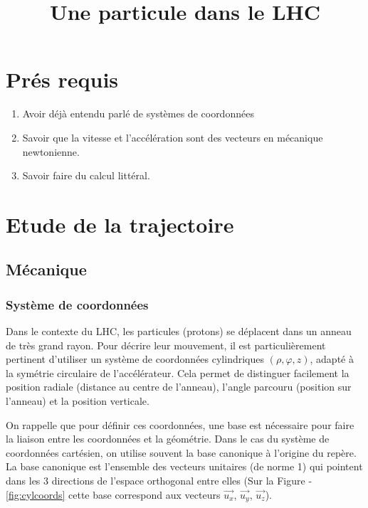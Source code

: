 \documentclass[14pt]{article}
\title{Une particule dans le LHC}
\author{}
\begin{document}
\maketitle
\tableofcontents

\section*{Prés requis}

\begin{enumerate}
    \item Avoir déjà entendu parlé de systèmes de coordonnées
    \item Savoir que la vitesse et l'accélération sont des vecteurs en mécanique newtonienne.
    \item Savoir faire du calcul littéral.
\end{enumerate}

\section{Etude de la trajectoire}


\subsection{Mécanique}\label{meca}

\subsubsection{Système de coordonnées}\label{coords}

Dans le contexte du LHC, les particules (protons) se déplacent dans un anneau de très grand rayon. Pour décrire leur mouvement, il est particulièrement pertinent d'utiliser un système de coordonnées cylindriques $(\rho,\varphi,z)$, adapté à la symétrie circulaire de l'accélérateur. Cela permet de distinguer facilement la position radiale (distance au centre de l'anneau), l'angle parcouru (position sur l'anneau) et la position verticale.

On rappelle que pour définir ces coordonnées, une base est nécessaire pour faire la liaison entre les coordonnées et la géométrie. Dans le cas du système de coordonnées cartésien, on utilise souvent la base canonique à l'origine du repère. La base canonique est l'ensemble des vecteurs unitaires (de norme 1) qui pointent dans les 3 directions de l'espace orthogonal entre elles (Sur la Figure - \ref{fig:cylcoords} cette base correspond aux vecteurs $\vec{u_x}$, $\vec{u_y}$, $\vec{u_z}$).
\end{document}
